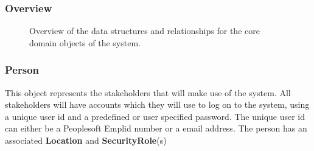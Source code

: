 \documentclass[12pt]{article}
\begin{document}
\subsubsection{Overview}

\begin{figure}[H]
\centering	
{}
\caption{Overview of the data structures and relationships for the core domain objects of the
system.}
\end{figure}

\newpage
\subsubsection{Person}
This object represents the stakeholders that will make use of the system. All stakeholders will have accounts which they will use to log on to the system, using a unique user id and a predefined or user specified password. The unique user id can either be a Peoplesoft Emplid number or a email address. The person has an associated \textbf{Location} and \textbf{SecurityRole}(s)
\end{document}
